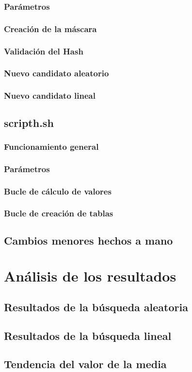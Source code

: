 \documentclass[a4paper, 11pt]{article}
\begin{document}
		\subsubsection{Parámetros}
		\subsubsection{Creación de la máscara}
		\subsubsection{Validación del Hash}
		\subsubsection{Nuevo candidato aleatorio}
		\subsubsection{Nuevo candidato lineal}
	\subsection{scripth.sh}
	
		\subsubsection{Funcionamiento general}
		\subsubsection{Parámetros}
		\subsubsection{Bucle de cálculo de valores}
		\subsubsection{Bucle de creación de tablas}

	\subsection{Cambios menores hechos a mano}

\section{Análisis de los resultados}
	\subsection{Resultados de la búsqueda aleatoria}
	\subsection{Resultados de la búsqueda lineal}
	\subsection{Tendencia del valor de la media}
\end{document}
